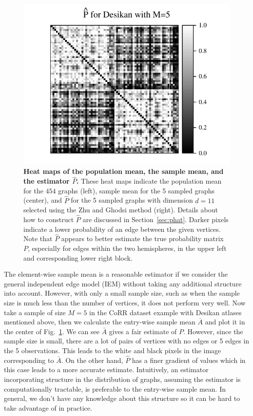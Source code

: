 \documentclass[10pt,letterpaper]{article}
\renewcommand{\hat}{\widehat}
\begin{document}
\begin{figure}[!tbp]
\includegraphics[height=.205\textheight]{Phat_desikan_m5.pdf}
\caption{{\bf Heat maps of the population mean, the sample mean, and the estimator $\hat{P}$.}
These heat maps indicate the population mean for the $454$ graphs (left), sample mean for the 5 sampled graphs (center), and $\hat{P}$ for the 5 sampled graphs with dimension $d=11$ selected using the Zhu and Ghodsi method (right). Details about how to construct $\hat{P}$ are discussed in Section~\ref{sec:phat}.
Darker pixels indicate a lower probability of an edge between the given vertices.
Note that $\hat{P}$ appears to better estimate the true probability matrix $P$, especially for edges within the two hemispheres, in the upper left and corresponding lower right block.
}
\label{fig:Matrix_desikan_m5}
\end{figure}



The element-wise sample mean is a reasonable estimator if we consider the general independent edge model (IEM) \citep{bollobas2007phase} without taking any additional structure into account. 
However, with only a small sample size, such as when the sample size is much less than the number of vertices, it does not perform very well.
Now take a sample of size $M=5$ in the CoRR dataset example with Desikan atlases mentioned above, then we calculate the entry-wise sample mean $\bar{A}$ and plot it in the center of Fig.~\ref{fig:Matrix_desikan_m5}. We can see $\bar{A}$ gives a fair estimate of $P$. However, since the sample size is small, there are a lot of pairs of vertices with no edges or 5 edges in the 5 observations. This leads to the white and black pixels in the image corresponding to $\bar{A}$.
On the other hand, $\hat{P}$ has a finer gradient of values which in this case leads to a more accurate estimate.
Intuitively, an estimator incorporating structure in the distribution of graphs, assuming the estimator is computationally tractable, is preferable to the entry-wise sample mean. 
In general, we don't have any knowledge about this structure so it can be hard to take advantage of in practice.
\end{document}
